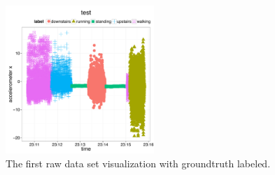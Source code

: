 \begin{figure}
  \includegraphics[width=0.5\textwidth]{figures/legend.pdf}
  \caption{The first raw data set visualization with groundtruth labeled.}
  \label{fig:soda1}
\end{figure}

